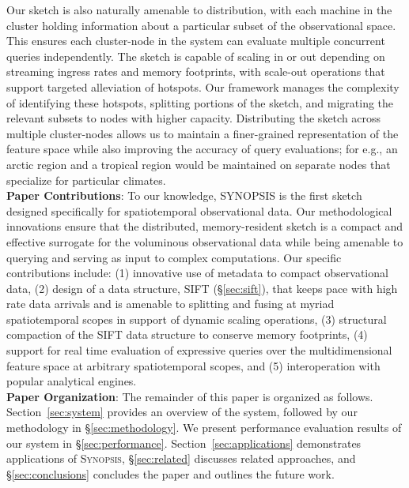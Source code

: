 Our sketch is also naturally amenable to distribution, with each machine in the cluster holding information about a particular subset of the observational space.  This ensures each cluster-node in the system can evaluate multiple concurrent queries independently. The sketch is capable of scaling in or out depending on streaming ingress rates and memory footprints, with scale-out operations that support targeted alleviation of hotspots. Our framework manages the complexity of identifying these hotspots, splitting portions of the sketch, and migrating the relevant subsets to nodes with higher capacity. Distributing the sketch across multiple cluster-nodes allows us to maintain a finer-grained representation of the feature space while also improving the accuracy of query evaluations; for e.g., an arctic region and a tropical region would be maintained on separate nodes that specialize for particular climates.
%
\vspace{0.7em}\\
%
\textbf{Paper Contributions}:
To our knowledge, SYNOPSIS is the first sketch designed specifically for spatiotemporal observational data. Our methodological innovations ensure that the distributed, memory-resident sketch is a compact and effective surrogate for the voluminous observational data while being amenable to querying and serving as input to complex computations. Our specific contributions include: (1) innovative use of metadata to compact observational data, (2) design of a data structure, SIFT (\S\ref{sec:sift}), that keeps pace with high rate data arrivals and is amenable to splitting and fusing at myriad spatiotemporal scopes in support of dynamic scaling operations, (3) structural compaction of the SIFT data structure to conserve memory footprints, (4) support for real time evaluation of expressive queries over the multidimensional feature space at arbitrary spatiotemporal scopes, and (5) interoperation with popular analytical engines.
%
\vspace{0.7em}\\
%
\textbf{Paper Organization}:
The remainder of this paper is organized as follows. Section~\ref{sec:system} provides an overview of the system, followed by our methodology in \S\ref{sec:methodology}. We present performance evaluation results of our system in \S\ref{sec:performance}. Section~\ref{sec:applications} demonstrates applications of \textsc{Synopsis}, \S\ref{sec:related} discusses related approaches, and \S\ref{sec:conclusions} concludes the paper and outlines the future work.
